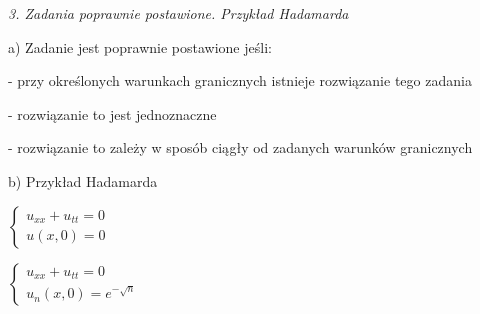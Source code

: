\textit{3. Zadania poprawnie postawione. Przykład Hadamarda}

a) Zadanie jest poprawnie postawione jeśli:

  - przy określonych warunkach granicznych istnieje rozwiązanie tego zadania
  
  - rozwiązanie to jest jednoznaczne

  - rozwiązanie to zależy w sposób ciągły od zadanych warunków granicznych

b) Przykład Hadamarda

$\left\{\begin{matrix} u_{xx} + u_{tt} = 0 \\ u(x,0) = 0 \end{matrix}\right.$

$\left\{\begin{matrix} u_{xx} + u_{tt} = 0 \\ u_n(x,0) = e^{-\sqrt{n}} \end{matrix}\right.$
